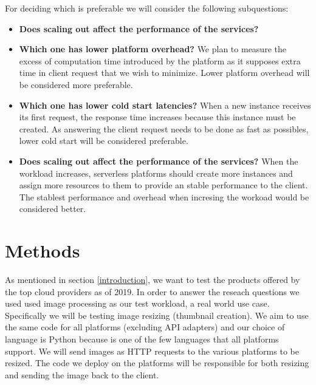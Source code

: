 \documentclass[11pt]{article}
\begin{document}
For deciding which is preferable we will consider the following subquestions:

\begin{itemize}

\item \textbf{Does scaling out affect the performance of the services?}

\item \textbf{Which one has lower platform overhead?}  We plan to measure the excess of computation time introduced by the platform as it supposes extra time in client request that we wish to minimize. Lower platform overhead will be considered more preferable.

\item \textbf{Which one has lower cold start latencies?} When a new instance receives its first request, the response time increases because this instance must be created. As answering the client request needs to be done as fast as possibles, lower cold start will be considered preferable.

\item \textbf{Does scaling out affect the performance of the services?} When the workload increases, serverless platforms should create more instances and assign more resources to them to provide an stable performance to the client. The stablest performance and overhead when incresing the workoad would be considered better.  
\end{itemize}





\section{Methods}
\label{methods}
As mentioned in section \ref{introduction}, we want to test the products offered by the top cloud providers as of 2019. In order to answer the reseach questions we used used image processing as our test workload, a real world \cite{ii} use case. Specifically we will be testing image resizing (thumbnail creation). We aim to use the same code for all platforms (excluding API adapters) and our choice of language is Python because is one of the few languages that all platforms support. We will send images as HTTP requests to the various platforms to be resized. The code we deploy on the platforms will be responsible for both resizing and sending the image back to the client.
\end{document}
